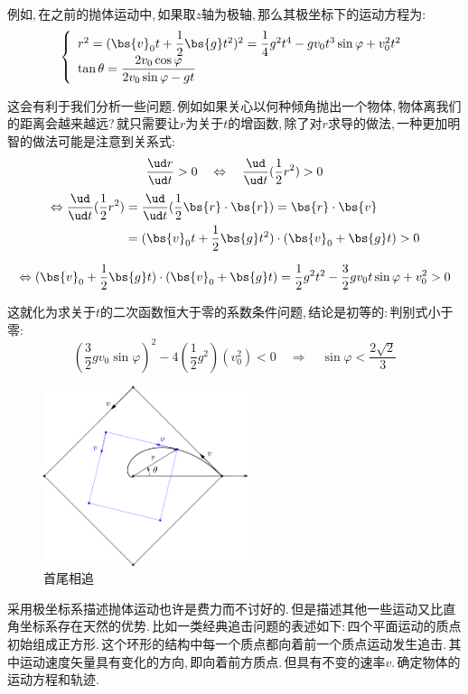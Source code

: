 例如,\,在之前的抛体运动中,\,如果取$z$轴为极轴,\,那么其极坐标下的运动方程为:
\[\left\{\begin{array}{l} r^2=(\bs{v}_0 t+\dfrac{1}{2}\bs{g}t^2)^2=\dfrac{1}{4}g^2t^4  -gv_0t^3\sin\varphi + v_0^2t^2\\[3pt] \tan\theta=\dfrac{2v_0 \cos\varphi}{2v_0 \sin\varphi-gt}\end{array}\right.\]

这会有利于我们分析一些问题.\,例如如果关心以何种倾角抛出一个物体,\,物体离我们的距离会越来越远?\,就只需要让$r$为关于$t$的增函数,\,除了对$r$求导的做法,\,一种更加明智的做法可能是注意到关系式:
\[\frac{\ud r}{\ud t}>0  \quad\Leftrightarrow\quad	\frac{\ud}{\ud t}(\frac{1}{2}r^2)>0\]
\begin{align*} 
\Leftrightarrow \frac{\ud}{\ud t}(\frac{1}{2}r^2)	&=\frac{\ud}{\ud t}(\frac{1}{2}{\bs{r}\cdot\bs{r}})=\bs{r}\cdot\bs{v}\\
																			&=(\bs{v}_0 t+\dfrac{1}{2}\bs{g}t^2)\cdot(\bs{v}_0 +\bs{g}t)>0\\
\end{align*}

\[\Leftrightarrow (\bs{v}_0 +\dfrac{1}{2}\bs{g}t)\cdot(\bs{v}_0 +\bs{g}t)=\dfrac{1}{2}g^2t^2  -\dfrac{3}{2}gv_0t\sin\varphi + v_0^2>0\]

这就化为求关于$t$的二次函数恒大于零的系数条件问题,\,结论是初等的:\,判别式小于零:
\[\left(\dfrac{3}{2}gv_0\sin\varphi\right)^2-4\left(\dfrac{1}{2}g^2 \right)(v_0^2)<0\quad \Rightarrow\quad \sin\varphi<\frac{2\sqrt{2}}{3}\]

\begin{figure}
\vspace{-0.4cm}
\centering
\includegraphics[width=6cm]{image/6-1-5.png}
\caption{首尾相追}\label{6-1-5}
\end{figure}
采用极坐标系描述抛体运动也许是费力而不讨好的.\,但是描述其他一些运动又比直角坐标系存在天然的优势.\,比如一类经典追击问题的表述如下:\,四个平面运动的质点初始组成正方形.\,这个环形的结构中每一个质点都向着前一个质点运动发生追击.\,其中运动速度矢量具有变化的方向,\,即向着前方质点.\,但具有不变的速率$v$.\,确定物体的运动方程和轨迹.


